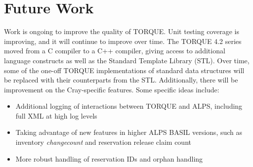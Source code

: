 \section{Future Work}

Work is ongoing to improve the quality of TORQUE.  Unit testing coverage is
improving, and it will continue to improve over time.  The TORQUE 4.2 series
moved from a C compiler to a C++ compiler, giving access to additional language
constructs as well as the Standard Template Library (STL).  Over time, some of
the one-off TORQUE implementations of standard data structures will be replaced
with their counterparts from the STL.  Additionally, there will be improvement
on the Cray-specific features.  Some specific ideas include:

\begin{itemize}
  \item Additional logging of interactions between TORQUE and ALPS, including 
        full XML at high log levels
  \item Taking advantage of new features in higher ALPS BASIL versions, such as
        inventory \emph{changecount} and reservation release claim count
  \item More robust handling of reservation IDs and orphan handling
\end{itemize}
